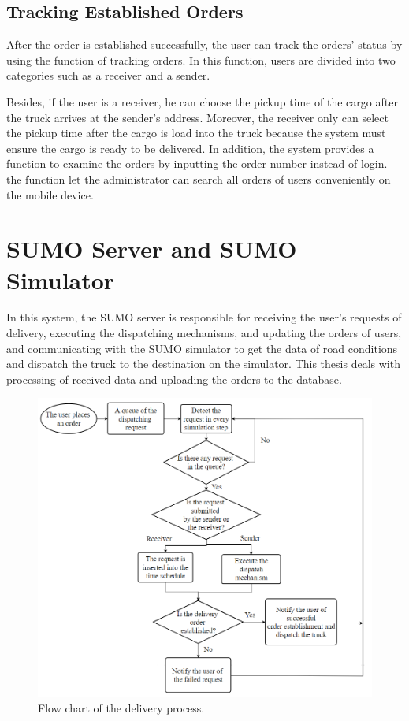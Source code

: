 \documentclass[12pt]{ksthesis}
\begin{document}
\begin{thesis}
{\subsection{Tracking Established Orders}
After the order is established successfully, the user can track the orders’ status by using the function of tracking orders. In this function, users are divided into two categories such as a receiver and a sender.

Besides, if the user is a receiver, he can choose the pickup time of the cargo after the truck arrives at the sender’s address.  
Moreover, the receiver only can select the pickup time after the cargo is load into the truck because the system must ensure the cargo is ready to be delivered. 
In addition, the system provides a function to examine the orders by inputting the order number instead of login. the function let the administrator can search all orders of users conveniently on the mobile device.

\section{SUMO Server and SUMO Simulator}
In this system, the SUMO server is responsible for receiving the user’s requests of delivery, executing the dispatching mechanisms, and updating the orders of users, and communicating with the SUMO simulator to get the data of road conditions and dispatch the truck to the destination on the simulator. This thesis deals with processing of received data and uploading the orders to the database.

\begin{figure}[H]
\centering
\includegraphics[width=1.0\textwidth]{./figures/F3-2_Flowchart.PNG}
\caption{\large Flow chart of the delivery process.}
\vspace{0.5cm}
\label{Fig:flow_chart}
\end{figure}




}
\end{thesis}
\end{document}
